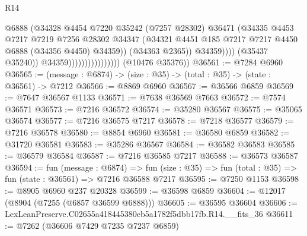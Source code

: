 \begin{lexlean}{R14}
\begin{coremodule}
                                                @6888
                                                (@34328
                                                  @4454
                                                  @7220
                                                  @35242
                                                  (@7257 @28302)
                                                  @36471
                                                  (@34335
                                                    @4453
                                                    @7217
                                                    @7219
                                                    @7256
                                                    @28302
                                                    @34347
                                                    (@34321
                                                      @4451
                                                      @185
                                                      @7217
                                                      @7217
                                                      @4450
                                                      @6888
                                                      (@34356 @4450)
                                                      @34359))
                                                  (@34363 @2365))
                                                @34359))))
                                        (@35437 @35240))
                                      @34359))))))))))))))))
      (@10476 @35376))
@36561 := @7284 @6960
@36565 := (message : @6874) -> (size : @35) -> (total : @35) -> (state : @36561) -> @7212
@36566 := @8869 @6960
@36567 := @36566 @6859
@36569 := @7647 @36567 @1133
@36571 := @7638 @36569 @7663
@36572 := @7574 @36571
@36573 := @7216 @36572
@36574 := @35280 @36567
@36575 := @35065 @36574
@36577 := @7216 @36575 @7217
@36578 := @7218 @36577
@36579 := @7216 @36578
@36580 := @8854 @6960
@36581 := @36580 @6859
@36582 := @31720 @36581
@36583 := @35286 @36567
@36584 := @36582 @36583
@36585 := @36579 @36584
@36587 := @7216 @36585 @7217
@36588 := @36573 @36587
@36594 := fun (message : @6874) =>
  fun (size : @35) => fun (total : @35) => fun (state : @36561) => @7216 @36588 @7217
@36595 := @7250 @1153
@36598 := @8905 @6960 @237 @20328
@36599 := @36598 @6859
@36604 := @12017 (@8904 (@7255 (@6857 @36599 @6888)))
@36605 := @36595 @36604
@36606 := LexLeanPreserve.C02655a418445380eb5a1782f5dbb17fb.R14.__fits_36
@36611 := @7262 (@36606 @7429 @7235 @7237 @6859)

\end{coremodule}
\end{lexlean}
